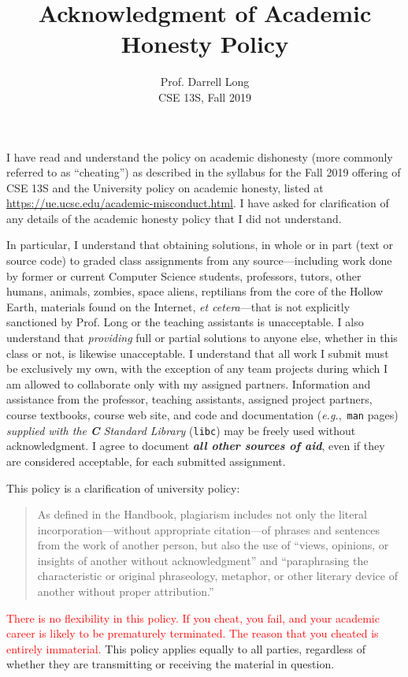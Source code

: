\documentclass{article}
\title{Acknowledgment of Academic Honesty Policy}
\author{Prof.\xspace Darrell Long \\
CSE 13S, Fall 2019}
\newcommand{\surl}[1]{{\fontsize{9}{11}\selectfont\url{#1}}}
\begin{document}
\maketitle
I have read and understand the policy on academic dishonesty (more
commonly referred to as ``cheating'') as described in the syllabus
for the Fall 2019 offering of CSE 13S 
and the University policy on academic honesty, listed at
\surl{https://ue.ucsc.edu/academic-misconduct.html}.  I have asked for
clarification of any details of the academic honesty policy that I
did not understand.

In particular, I understand that obtaining solutions, in whole or
in part (text or source code) to graded class assignments from any
source---including work done by former or current Computer Science
students, professors, tutors, other humans, animals, zombies, space
aliens, reptilians from the core of the Hollow Earth,
materials found on the Internet, \emph{et cetera}---that
is not explicitly sanctioned by Prof.\xspace Long or the teaching assistants is unacceptable.
I also understand that \emph{providing} full or partial solutions
to anyone else, whether in this class or not, is likewise unacceptable.
I understand that all work I submit must be exclusively my own,
with the exception of any team projects during which I am allowed
to collaborate only with my assigned partners.  Information and
assistance from the professor, teaching assistants, assigned project partners, course
textbooks, course web site, and code and documentation
(\emph{e.g.},~\texttt{man} pages) \emph{supplied with the \textbf{C} Standard
Library} (\texttt{libc})
may be freely used without acknowledgment.  I agree to document
\textbf{\emph{all other sources of aid}}, even if they are considered
acceptable, for each submitted assignment.

This policy is a clarification of university policy:
\begin{quote}
As defined in the Handbook, plagiarism includes not only the literal
incorporation---without appropriate citation---of phrases and
sentences from the work of another person, but also the use of
``views, opinions, or insights of another without acknowledgment''
and ``paraphrasing the characteristic or original phraseology,
metaphor, or other literary device of another without proper
attribution.''
\end{quote}


\textcolor{red}{There is no flexibility in this policy. If you
cheat, you fail, and your academic career is likely to be prematurely
terminated. The reason that you cheated is entirely immaterial.}
This policy applies equally to all parties, regardless of whether
they are transmitting or receiving the material in question.
\end{document}
